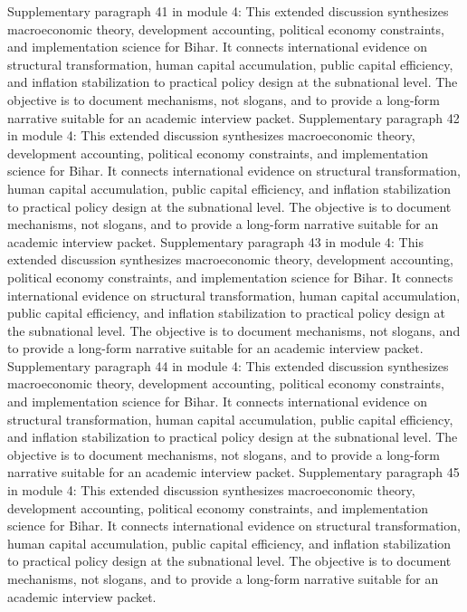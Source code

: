 \documentclass[preprint,12pt]{elsarticle}
\begin{document}
Supplementary paragraph 41 in module 4: This extended discussion synthesizes macroeconomic theory, development accounting, political economy constraints, and implementation science for Bihar. It connects international evidence on structural transformation, human capital accumulation, public capital efficiency, and inflation stabilization to practical policy design at the subnational level. The objective is to document mechanisms, not slogans, and to provide a long-form narrative suitable for an academic interview packet.
Supplementary paragraph 42 in module 4: This extended discussion synthesizes macroeconomic theory, development accounting, political economy constraints, and implementation science for Bihar. It connects international evidence on structural transformation, human capital accumulation, public capital efficiency, and inflation stabilization to practical policy design at the subnational level. The objective is to document mechanisms, not slogans, and to provide a long-form narrative suitable for an academic interview packet.
Supplementary paragraph 43 in module 4: This extended discussion synthesizes macroeconomic theory, development accounting, political economy constraints, and implementation science for Bihar. It connects international evidence on structural transformation, human capital accumulation, public capital efficiency, and inflation stabilization to practical policy design at the subnational level. The objective is to document mechanisms, not slogans, and to provide a long-form narrative suitable for an academic interview packet.
Supplementary paragraph 44 in module 4: This extended discussion synthesizes macroeconomic theory, development accounting, political economy constraints, and implementation science for Bihar. It connects international evidence on structural transformation, human capital accumulation, public capital efficiency, and inflation stabilization to practical policy design at the subnational level. The objective is to document mechanisms, not slogans, and to provide a long-form narrative suitable for an academic interview packet.
Supplementary paragraph 45 in module 4: This extended discussion synthesizes macroeconomic theory, development accounting, political economy constraints, and implementation science for Bihar. It connects international evidence on structural transformation, human capital accumulation, public capital efficiency, and inflation stabilization to practical policy design at the subnational level. The objective is to document mechanisms, not slogans, and to provide a long-form narrative suitable for an academic interview packet.
\end{document}
